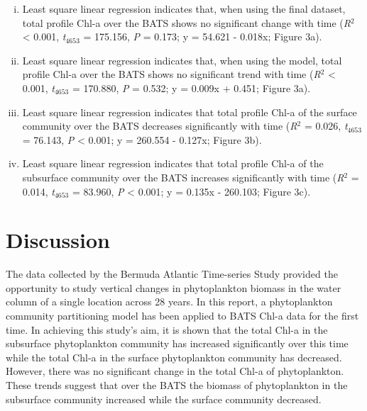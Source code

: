 \documentclass{article}
\begin{document}
\begin{enumerate}[(i)]
    \item Least square linear regression indicates that, when using the final dataset, total profile Chl-a over the BATS shows no significant change with time (\textit{R}$^2$ < 0.001, \textit{t}$_{4653}$ = 175.156, \textit{P} = 0.173; y = 54.621 - 0.018x; Figure 3a).
    \item Least square linear regression indicates that, when using the model, total profile Chl-a over the BATS shows no significant trend with time (\textit{R}$^2$ < 0.001, \textit{t}$_{4653}$ = 170.880, \textit{P} = 0.532; y = 0.009x + 0.451; Figure 3a).
    \item Least square linear regression indicates that total profile Chl-a of the surface community over the BATS decreases significantly with time (\textit{R}$^2$ = 0.026, \textit{t}$_{4653}$ = 76.143, \textit{P} < 0.001; y = 260.554 - 0.127x; Figure 3b). 
    \item Least square linear regression indicates that total profile Chl-a of the subsurface community over the BATS increases significantly with time (\textit{R}$^2$ = 0.014, \textit{t}$_{4653}$ = 83.960, \textit{P} < 0.001; y = 0.135x - 260.103; Figure 3c). 
\end{enumerate}

\section{Discussion}
The data collected by the Bermuda Atlantic Time-series Study provided the opportunity to study vertical changes in phytoplankton biomass in the water column of a single location across 28 years. In this report, a phytoplankton community partitioning model has been applied to BATS Chl-a data for the first time. In achieving this study's aim, it is shown that the total Chl-a in the subsurface phytoplankton community has increased significantly over this time while the total Chl-a in the surface phytoplankton community has decreased. However, there was no significant change in the total Chl-a of phytoplankton. These trends suggest that over the BATS the biomass of phytoplankton in the subsurface community increased while the surface community decreased. 
\end{document}
